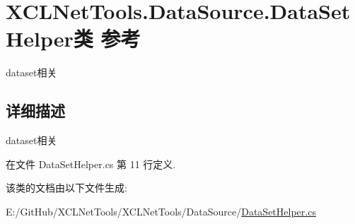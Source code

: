 \hypertarget{class_x_c_l_net_tools_1_1_data_source_1_1_data_set_helper}{}\section{X\+C\+L\+Net\+Tools.\+Data\+Source.\+Data\+Set\+Helper类 参考}
\label{class_x_c_l_net_tools_1_1_data_source_1_1_data_set_helper}


dataset相关  




\subsection{详细描述}
dataset相关 



在文件 Data\+Set\+Helper.\+cs 第 11 行定义.



该类的文档由以下文件生成\+:\begin{DoxyCompactItemize}
\item 
E\+:/\+Git\+Hub/\+X\+C\+L\+Net\+Tools/\+X\+C\+L\+Net\+Tools/\+Data\+Source/\hyperlink{_data_set_helper_8cs}{Data\+Set\+Helper.\+cs}\end{DoxyCompactItemize}
